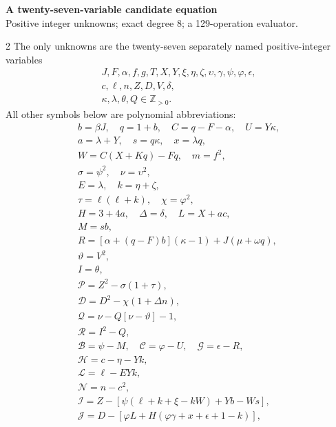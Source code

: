 \documentclass[10pt]{article}
\begin{document}
\begin{center}
{\large\bfseries A twenty-seven-variable candidate equation}\\[-1pt]
{\small Positive integer unknowns; exact degree 8; a 129-operation evaluator.}
\end{center}\vspace{-8pt}
\begin{multicols}{2}
\fontsize{8.6}{9.1}\selectfont
The only unknowns are the twenty-seven separately named positive-integer variables
\[
\begin{gathered}J,F,\alpha,f,g,T,X,Y,\xi,\eta,\zeta,\upsilon,\gamma,\psi,\varphi,\epsilon,\\
c,\ell,n,Z,D,V,\delta,\\
\kappa,\lambda,\theta,Q\in\mathbb Z_{>0}.\end{gathered}
\]
All other symbols below are polynomial abbreviations:
\[
\begin{gathered}
b=\beta J,\quad q=1+b,\quad C=q-F-\alpha,\quad U=Y\kappa,\\
a=\lambda+Y,\quad s=q\kappa,\quad x=\lambda q,\\
W=C(X+Kq)-Fq,\quad m=f^2,\\
\sigma=\psi^2,\quad\nu=\upsilon^2,\\
E=\lambda,\quad k=\eta+\zeta,\\
\tau=\ell(\ell+k),\quad\chi=\varphi^2,\\
H=3+4a,\quad\Delta=\delta,\quad L=X+ac,\\
M=sb,\\
R=[\alpha+(q-F)b](\kappa-1)+J(\mu+\omega q),\\
\vartheta=V^2,\\
I=\theta,\\
\mathcal{P}=Z^2-\sigma(1+\tau),\\
\mathcal{D}=D^2-\chi(1+\Delta n),\\
\mathcal{Q}=\nu-Q[\nu-\vartheta]-1,\\
\mathcal{R}=I^2-Q,\\
\mathcal{B}=\psi-M,\quad \mathcal{C}=\varphi-U,\quad \mathcal{G}=\epsilon-R,\\
\mathcal{H}=c-\eta-Yk,\\
\mathcal{L}=\ell-EYk,\\
\mathcal{N}=n-c^2,\\
\mathcal{I}=Z-[\psi(\ell+k+\xi-kW)+Yb-Ws],\\
\mathcal{J}=D-[\varphi L+H(\varphi\gamma+x+\epsilon+1-k)],\\

\end{gathered}\]
\end{multicols}
\end{document}
